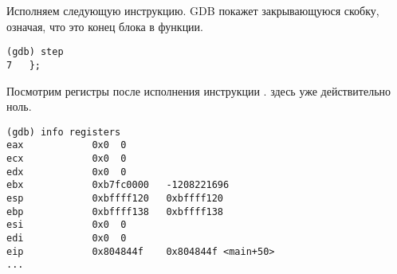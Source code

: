 Исполняем следующую инструкцию.
\ac{GDB} покажет закрывающуюся скобку, означая, что это конец блока в функции.

\begin{lstlisting}
(gdb) step
7	};
\end{lstlisting}

Посмотрим регистры после исполнения инструкции .
\EAX здесь уже действительно ноль.

\begin{lstlisting}
(gdb) info registers
eax            0x0	0
ecx            0x0	0
edx            0x0	0
ebx            0xb7fc0000	-1208221696
esp            0xbffff120	0xbffff120
ebp            0xbffff138	0xbffff138
esi            0x0	0
edi            0x0	0
eip            0x804844f	0x804844f <main+50>
...
\end{lstlisting}
